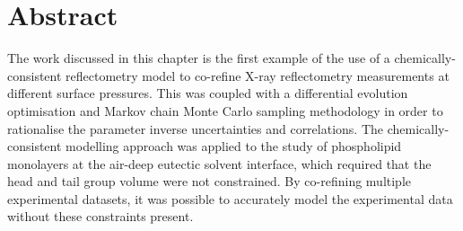 \section*{Abstract}
The work discussed in this chapter is the first example of the use of a chemically-consistent reflectometry model to co-refine X-ray reflectometry measurements at different surface pressures.
This was coupled with a differential evolution optimisation and Markov chain Monte Carlo sampling methodology in order to rationalise the parameter inverse uncertainties and correlations.
The chemically-consistent modelling approach was applied to the study of phospholipid monolayers at the air-deep eutectic solvent interface, which required that the head and tail group volume were not constrained.
By co-refining multiple experimental datasets, it was possible to accurately model the experimental data without these constraints present.
